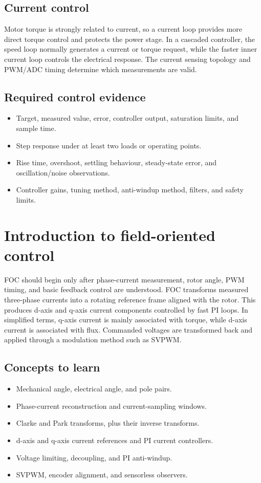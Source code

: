 \documentclass[11pt,a4paper]{article}
\begin{document}
\subsection{Current control}

Motor torque is strongly related to current, so a current loop provides more
direct torque control and protects the power stage. In a cascaded controller,
the speed loop normally generates a current or torque request, while the
faster inner current loop controls the electrical response. The current
sensing topology and PWM/ADC timing determine which measurements are valid.

\subsection{Required control evidence}

\begin{itemize}
  \item Target, measured value, error, controller output, saturation limits, and sample time.
  \item Step response under at least two loads or operating points.
  \item Rise time, overshoot, settling behaviour, steady-state error, and oscillation/noise observations.
  \item Controller gains, tuning method, anti-windup method, filters, and safety limits.
\end{itemize}

\section{Introduction to field-oriented control}

FOC should begin only after phase-current measurement, rotor angle, PWM
timing, and basic feedback control are understood. FOC transforms measured
three-phase currents into a rotating reference frame aligned with the rotor.
This produces d-axis and q-axis current components controlled by fast PI
loops. In simplified terms, q-axis current is mainly associated with torque,
while d-axis current is associated with flux. Commanded voltages are
transformed back and applied through a modulation method such as SVPWM.

\subsection{Concepts to learn}

\begin{itemize}
  \item Mechanical angle, electrical angle, and pole pairs.
  \item Phase-current reconstruction and current-sampling windows.
  \item Clarke and Park transforms, plus their inverse transforms.
  \item d-axis and q-axis current references and PI current controllers.
  \item Voltage limiting, decoupling, and PI anti-windup.
  \item SVPWM, encoder alignment, and sensorless observers.
\end{itemize}
\end{document}
